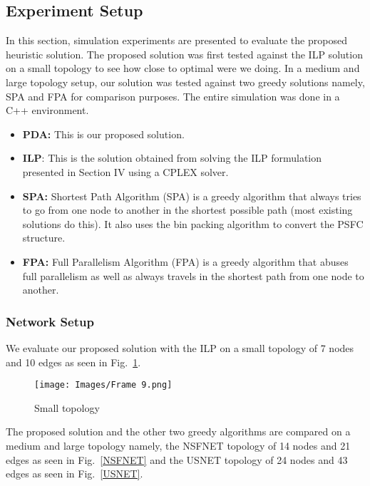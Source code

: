 \documentclass[journal]{IEEEtran}
\begin{document}
\subsection{Experiment Setup}
In this section, simulation experiments are presented to evaluate the proposed heuristic solution. The proposed solution was first tested against the ILP solution on a small topology to see how close to optimal were we doing. In a medium and large topology setup, our solution was tested against two greedy solutions namely, SPA and FPA for comparison purposes. The entire simulation was done in a C++ environment.
\begin{itemize}
   \item \textbf{PDA:} This is our proposed solution.
   \item \textbf{ILP}: This is the solution obtained from solving the ILP formulation presented in Section IV using a CPLEX solver.
    \item \textbf{SPA:} Shortest Path Algorithm (SPA) is a greedy algorithm that always tries to go from one node to another in the shortest possible path (most existing solutions do this). It also uses the bin packing algorithm to convert the PSFC structure.
    \item \textbf{FPA:} Full Parallelism Algorithm (FPA) is a greedy algorithm that abuses full parallelism as well as always travels in the shortest path from one node to another.
\end{itemize}


\subsubsection{Network Setup}
We evaluate our proposed solution with the ILP on a small topology of 7 nodes and 10 edges as seen in Fig.~\ref{small topology}. 
\begin{figure}[!htb]
\centering
\texttt{[image: Images/Frame 9.png]}
\caption{Small topology}
\label{small topology}
\vspace{0.4cm}
\end{figure}
The proposed solution and the other two greedy algorithms are compared on a medium and large topology namely, the NSFNET topology of 14 nodes and 21 edges as seen in Fig.~\ref{NSFNET} and the USNET topology of 24 nodes and 43 edges as seen in Fig.~\ref{USNET}.
\end{document}
